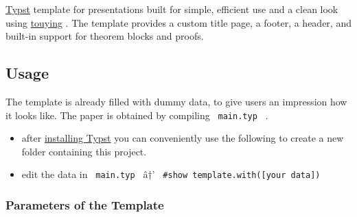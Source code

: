 \href{https://typst.app/home/}{Typst} template for presentations built
for simple, efficient use and a clean look using
\href{https://touying-typ.github.io/}{touying} . The template provides a
custom title page, a footer, a header, and built-in support for theorem
blocks and proofs.

\subsection{Usage}\label{usage}

The template is already filled with dummy data, to give users an
impression how it looks like. The paper is obtained by compiling
\texttt{\ main.typ\ } .

\begin{itemize}
\tightlist
\item
  after
  \href{https://github.com/typst/typst?tab=readme-ov-file\#installation}{installing
  Typst} you can conveniently use the following to create a new folder
  containing this project.
\end{itemize}

\begin{Shaded}
\begin{Highlighting}[]
\end{Highlighting}
\end{Shaded}

\begin{itemize}
\tightlist
\item
  edit the data in \texttt{\ main.typ\ } â†'
  \texttt{\ \#show\ template.with({[}your\ data{]})\ }
\end{itemize}

\subsubsection{Parameters of the
Template}\label{parameters-of-the-template}

